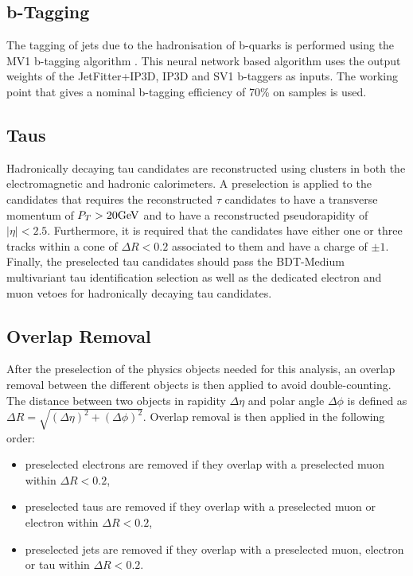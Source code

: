 \subsection{b-Tagging}
\label{sec:presel:btag}

The tagging of jets due to the hadronisation of b-quarks is performed
using the MV1 b-tagging algorithm \cite{mv1}. This neural network based
algorithm uses the output weights of the JetFitter+IP3D, IP3D and
SV1 b-taggers as inputs. The working point that gives a nominal
b-tagging efficiency of 70\% on \ttbar samples is used.

\subsection{Taus}
\label{sec:presel:tau}

Hadronically decaying tau candidates are reconstructed using clusters
in both the electromagnetic and hadronic calorimeters. A preselection
is applied to the candidates that requires the reconstructed $\tau$
candidates to have a transverse momentum of $P_{T}>20 \text{GeV}$ and to have
a reconstructed pseudorapidity of $|\eta| < 2.5$. Furthermore, it is
required that the candidates have either one or three tracks within a
cone of $\Delta R < 0.2$ associated to them and have a charge of $\pm
1$. Finally, the preselected tau candidates should pass the BDT-Medium
multivariant tau identification selection as well as the dedicated
electron and muon vetoes for hadronically decaying tau candidates.


\subsection{Overlap Removal}
\label{sec:presel:olr}

After the preselection of the physics objects needed for this
analysis, an overlap removal between the different objects is then
applied to avoid double-counting.  The distance between two objects in
rapidity $\Delta\eta$ and polar angle $\Delta\phi$ is defined as
$\Delta R=\sqrt{(\Delta\eta)^2+(\Delta\phi)^2}$. Overlap removal is
then applied in the following order:

\begin{itemize}
\item preselected electrons are removed if they overlap with a preselected muon  within $\Delta R < 0.2$,
\item preselected taus are removed if they overlap with a preselected muon or electron within $\Delta R < 0.2$,
\item preselected jets are removed  if they overlap with a preselected
  muon, electron or tau within \linebreak $\Delta R<0.2$.
\end{itemize}

